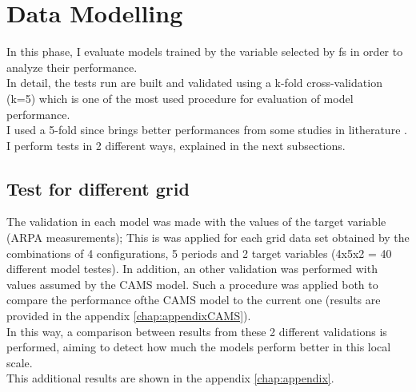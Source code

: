 \pagebreak
\section{Data Modelling}
\label{sec:modelling}
In this phase, I evaluate models trained by the variable selected by \acrshort{fs} in order to analyze their performance.\\
In detail, the tests run are built and validated using a k-fold cross-validation (k=5) which is one of the most used procedure for evaluation of model performance.\\
I used a 5-fold since brings better performances from some studies in litherature  \cite{anguita2005k} \cite{jung2020evaluation}.
I perform tests in 2 different ways, explained in the next subsections.
\subsection{Test for different grid}
The validation in each model was made with the values of the target variable (ARPA measurements);
This is was applied for each grid data set obtained by the combinations of 4 configurations, 5 periods and 2 target variables (4x5x2 = 40 different model testes). 
In addition, an other validation was performed with values assumed by the CAMS model.
Such a procedure was applied both to compare the performance ofthe CAMS model to the current one (results are provided in the appendix \ref{chap:appendixCAMS}).\\
In this way, a comparison between results from these 2 different validations is performed, aiming to detect how much the models perform better in this local scale.\\
This additional results are shown in the appendix \ref{chap:appendix}. 

